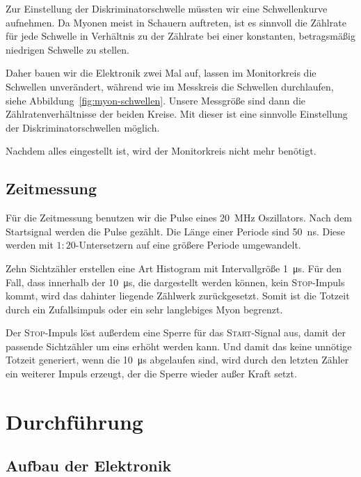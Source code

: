 \documentclass[11pt, ngerman, fleqn, DIV=15, headinclude, BCOR=2cm]{scrreprt}
\begin{document}
Zur Einstellung der Diskriminatorschwelle müssten wir eine Schwellenkurve
aufnehmen. Da Myonen meist in Schauern auftreten, ist es sinnvoll die Zählrate
für jede Schwelle in Verhältnis zu der Zählrate bei einer konstanten,
betragsmäßig niedrigen Schwelle zu stellen.

Daher bauen wir die Elektronik zwei Mal auf, lassen im Monitorkreis die
Schwellen unverändert, während wie im Messkreis die Schwellen durchlaufen,
siehe Abbildung~\ref{fig:myon-schwellen}. Unsere Messgröße sind dann die
Zählratenverhältnisse der beiden Kreise. Mit dieser ist eine sinnvolle
Einstellung der Diskriminatorschwellen möglich.

Nachdem alles eingestellt ist, wird der Monitorkreis nicht mehr benötigt.


\subsection{Zeitmessung}

Für die Zeitmessung benutzen wir die Pulse eines \SI{20}{\mega\hertz}
Oszillators. Nach dem Startsignal werden die Pulse gezählt. Die Länge einer
Periode sind \SI{50}{\nano\second}. Diese werden mit $1:20$-Untersetzern
auf eine größere Periode umgewandelt.

Zehn Sichtzähler erstellen eine Art Histogram mit Intervallgröße
\SI{1}{\micro\second}. Für den Fall, dass innerhalb der \SI{10}{\micro\second},
die dargestellt werden können, kein \textsc{Stop}-Impuls kommt, wird das
dahinter liegende Zählwerk zurückgesetzt. Somit ist die Totzeit durch ein
Zufallsimpuls oder ein sehr langlebiges Myon begrenzt.

Der \textsc{Stop}-Impuls löst außerdem eine Sperre für das
\textsc{Start}-Signal aus, damit der passende Sichtzähler um eins erhöht werden
kann. Und damit das keine unnötige Totzeit generiert, wenn die
\SI{10}{\micro\second} abgelaufen sind, wird durch den letzten Zähler ein
weiterer Impuls erzeugt, der die Sperre wieder außer Kraft setzt.

\section{Durchführung}

\subsection{Aufbau der Elektronik}
\end{document}
